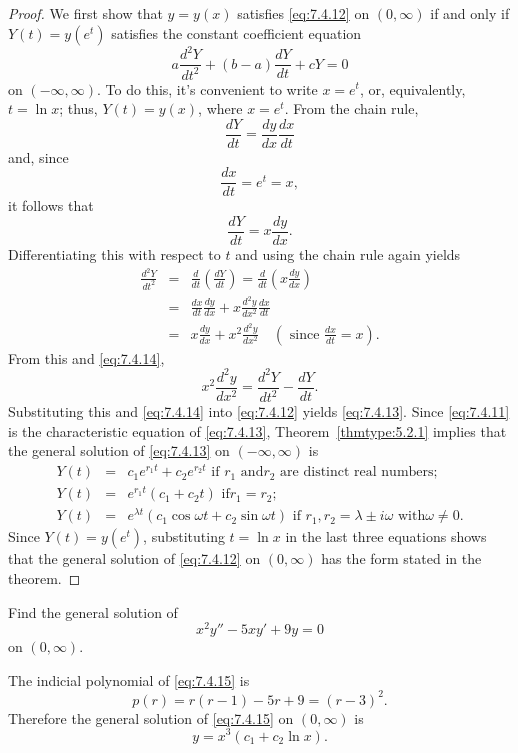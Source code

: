 \documentclass{ximera}
\begin{document}
\begin{proof}
We first show that $y=y(x)$ satisfies \eqref{eq:7.4.12} on
$(0,\infty)$ if and only if $Y(t)=y(e^t)$ satisfies the constant
coefficient equation
\begin{equation} \label{eq:7.4.13}
a\frac{d^2Y}{dt^2}+(b-a)\frac{dY}{dt}+cY=0
\end{equation} on
$(-\infty,\infty)$. To do this, it's convenient to write $x=e^t$, or,
equivalently, $t=\ln x$;   thus, $Y(t)=y(x)$, where $x=e^t$. From the
chain rule,
$$
\frac{dY}{dt}=\frac{dy}{dx}\frac{dx}{dt}
$$
and, since
$$
\frac{dx}{dt}=e^t=x,
$$
it follows that
\begin{equation} \label{eq:7.4.14}
\frac{dY}{dt}=x\frac{dy}{dx}.
\end{equation}
Differentiating this with
respect to $t$ and using the chain rule again yields
\begin{eqnarray*}
\frac{d^2Y}{dt^2}&=&\frac{d}{dt}\left(\frac{dY}{dt}\right)=\frac{d}{dt}\left(x\frac{dy}{dx}\right)\\
&=&\frac{dx}{dt}\frac{dy}{dx}+x\frac{d^2y}{dx^2}\frac{dx}{dt}\\
&=&x\frac{dy}{dx}+x^2\frac{d^2y}{dx^2}\quad\left(\mbox{ since } \frac{dx}{dt}=x\right).
\end{eqnarray*}
From this and \eqref{eq:7.4.14},
$$
x^2\frac{d^2y}{dx^2}=\frac{d^2Y}{dt^2}-\frac{dY}{dt}.
$$
Substituting this and \eqref{eq:7.4.14} into \eqref{eq:7.4.12} yields
\eqref{eq:7.4.13}. Since \eqref{eq:7.4.11} is the characteristic equation of
\eqref{eq:7.4.13}, Theorem~\ref{thmtype:5.2.1} implies that the general solution
of \eqref{eq:7.4.13} on $(-\infty,\infty)$ is
\begin{eqnarray*}
Y(t)&=&c_1e^{r_1t}+c_2e^{r_2t}\mbox{ if $r_1$ and
$r_2$ are distinct real numbers;  }\\
 Y(t)&=&e^{r_1t}(c_1+c_2t)\mbox{ if
$r_1=r_2$;  }\\
Y(t)&=&e^{\lambda t }\left(c_1\cos\omega
t+c_2\sin\omega t \right)\mbox{ if $r_1,r_2=\lambda\pm i\omega$ with
$\omega\neq0$}.
\end{eqnarray*}
Since $Y(t)=y(e^t)$, substituting $t=\ln x$ in the last three
equations shows that the general solution of \eqref{eq:7.4.12} on
$(0,\infty)$ has the form stated in the theorem.
\end{proof}

\begin{example}\label{example:7.4.6}
 Find the general solution of
\begin{equation} \label{eq:7.4.15}
x^2y''-5xy'+9y=0
\end{equation}
on $(0,\infty)$.
\begin{explanation}
The indicial polynomial of \eqref{eq:7.4.15} is
$$
p(r)=r(r-1)-5r+9=(r-3)^2.
$$
Therefore the general solution of \eqref{eq:7.4.15} on $(0,\infty)$ is
$$
y=x^3(c_1+c_2 \ln x).
$$
\end{explanation}
\end{example}
\end{document}
